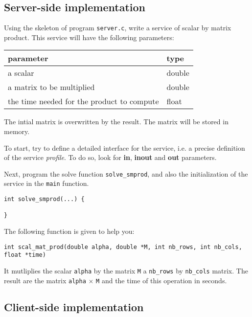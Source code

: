\documentclass[11pt,a4paper]{article}
\begin{document}
\subsection{Server-side implementation}

Using the skeleton of program \texttt{server.c}, write a service of scalar by
matrix product. This service will have the following parameters:

\begin{center}
\begin{tabular}{|l|l|}
\hline
parameter & type \\
\hline
a scalar & double \\
a matrix to be multiplied & double \\
the time needed for the product to compute & float \\
\hline
\end{tabular}
\end{center}

The intial matrix is overwritten by the result. The matrix will be
stored in memory. \par

To start, try to define a detailed interface for the service, i.e. a precise
definition of the service \emph{profile}. To do so, look for {\bf in},
{\bf inout} and {\bf out} parameters. \par

Next, program the solve function \texttt{solve\_smprod}, and also the
initialization of the service in the \texttt{main} function. \par

\footnotesize
\begin{verbatim}
int solve_smprod(...) {

}
\end{verbatim}
\normalsize
\noindent
The following function is given to help you:
\footnotesize
\begin{verbatim}
int scal_mat_prod(double alpha, double *M, int nb_rows, int nb_cols, float *time)
\end{verbatim}
\normalsize
\noindent

It mutliplies the scalar \texttt{alpha} by the matrix \texttt{M} a
\texttt{nb\_rows} by \texttt{nb\_cols} matrix. The result are the
matrix \texttt{alpha} $\times$ \texttt{M} and the time of this
operation in seconds.

\subsection{Client-side implementation}
\end{document}
